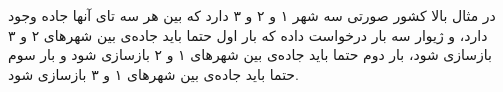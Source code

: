 \documentclass[11.5pt,a4paper,oneside]{article}
\begin{document}
\begin{problem}
\sampleIO

\begin{example}
%
\end{example}

\sampleIODescription
در مثال بالا کشور صورتی سه شهر ۱ و ۲ و ۳ دارد که بین هر سه تای آنها جاده وجود دارد،‌ و ژیوار سه بار درخواست داده که بار اول حتما باید جاده‌ی بین شهر‌های ۲ و ۳ باز‌سازی شود، بار دوم حتما باید جاده‌ی بین شهر‌های ۱ و ۲ بازسازی شود و بار سوم حتما باید جاده‌ی بین شهر‌های ۱ و ۳ بازسازی شود.
\end{problem}
\end{document}
